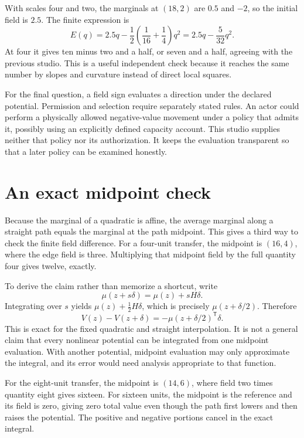 With scales four and two, the marginals at \((18,2)\) are \(0.5\) and \(-2\), so the initial field is \(2.5\). The finite expression is
\begin{equation}
E(q)=2.5q-\frac12\left(\frac1{16}+\frac14\right)q^2
=2.5q-\frac5{32}q^2.
\end{equation}
At four it gives ten minus two and a half, or seven and a half, agreeing with the previous studio. This is a useful independent check because it reaches the same number by slopes and curvature instead of direct local squares.

For the final question, a field sign evaluates a direction under the declared potential. Permission and selection require separately stated rules. An actor could perform a physically allowed negative-value movement under a policy that admits it, possibly using an explicitly defined capacity account. This studio supplies neither that policy nor its authorization. It keeps the evaluation transparent so that a later policy can be examined honestly.

\section{An exact midpoint check}

Because the marginal of a quadratic is affine, the average marginal along a straight path equals the marginal at the path midpoint. This gives a third way to check the finite field difference. For a four-unit transfer, the midpoint is \((16,4)\), where the edge field is three. Multiplying that midpoint field by the full quantity four gives twelve, exactly.

To derive the claim rather than memorize a shortcut, write
\begin{equation}
\mu(z+s\delta)=\mu(z)+sH\delta.
\end{equation}
Integrating over \(s\) yields \(\mu(z)+\tfrac12H\delta\), which is precisely \(\mu(z+\delta/2)\). Therefore
\begin{equation}
V(z)-V(z+\delta)=-\mu(z+\delta/2)^{\mathsf T}\delta.
\end{equation}
This is exact for the fixed quadratic and straight interpolation. It is not a general claim that every nonlinear potential can be integrated from one midpoint evaluation. With another potential, midpoint evaluation may only approximate the integral, and its error would need analysis appropriate to that function.

For the eight-unit transfer, the midpoint is \((14,6)\), where field two times quantity eight gives sixteen. For sixteen units, the midpoint is the reference and its field is zero, giving zero total value even though the path first lowers and then raises the potential. The positive and negative portions cancel in the exact integral.


